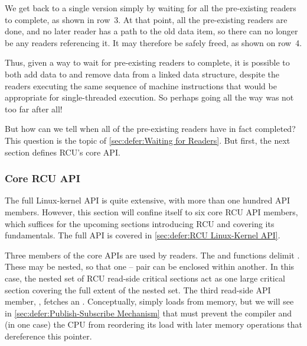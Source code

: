 We get back to a single version simply by waiting for all the
pre-existing readers to complete, as shown in row~3.
At that point, all the pre-existing readers are done, and no later
reader has a path to the old data item, so there can no longer be
any readers referencing it.
It may therefore be safely freed, as shown on row~4.

Thus, given a way to wait for pre-existing readers to complete,
it is possible to both add data to and remove data from a linked
data structure, despite the readers executing the same sequence
of machine instructions that would be appropriate for single-threaded
execution.
So perhaps going all the way was not too far after all!

But how can we tell when all of the pre-existing readers have in
fact completed?
This question is the topic of \cref{sec:defer:Waiting for Readers}.
But first, the next section defines RCU's core API.

\subsubsection{Core RCU API}
\label{sec:defer:Core RCU API}

The full Linux-kernel API is quite extensive, with more than one
hundred API members.
However, this section will confine itself to six core RCU API members,
which suffices for the upcoming sections introducing RCU and covering
its fundamentals.
The full API is covered in \cref{sec:defer:RCU Linux-Kernel API}.

Three members of the core APIs are used by readers.
The  and  functions delimit
.
These may be nested, so that one --
pair can be enclosed within another.
In this case, the nested set of RCU read-side critical sections act as
one large critical section covering the full extent of the nested set.
The third read-side API member, , fetches an
.
Conceptually,  simply loads from memory, but we
will see in
\cref{sec:defer:Publish-Subscribe Mechanism}
that  must prevent the compiler and (in
one case) the CPU from reordering its load with later memory operations
that dereference this pointer.

\QuickQuizEnd

